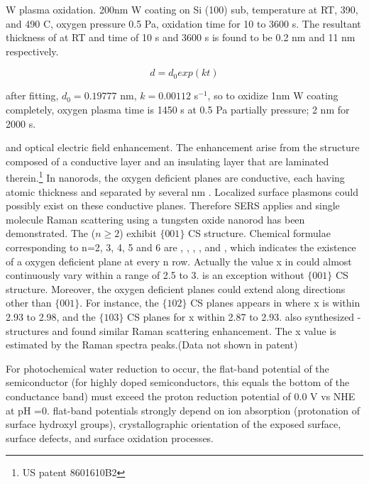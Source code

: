 W plasma oxidation.\cite{Romanyuk2005} 200nm W coating on Si (100) sub, temperature at RT, 390, and 490 C, oxygen pressure 0.5 Pa, oxidation time for 10 to 3600 s. The resultant thickness of  at RT  and time of 10 s and 3600 s is found to be 0.2 nm and 11 nm respectively.

\[
 d = d_0 exp(kt)
\]

after fitting, $d_0 = 0.19777$ nm, $k = 0.00112 $ s$^{-1}$, so to oxidize 1nm W coating completely, oxygen plasma time is 1450 s at 0.5 Pa partially pressure; 2 nm for 2000 s.



 and optical electric field enhancement. The enhancement arise from the structure composed of a conductive layer and an insulating layer that are laminated therein.\footnote{US patent 8601610B2} In  nanorods, the oxygen deficient planes are conductive, each having atomic thickness and separated by several nm . Localized surface plasmons could possibly exist on these conductive planes. Therefore SERS applies and single molecule Raman scattering using a tungsten oxide nanorod has been demonstrated. The  ($n \geq 2$) exhibit $\{ 001 \}$ CS structure. Chemical formulae corresponding to n=2, 3, 4, 5 and 6 are , , , , and , which indicates the existence of a oxygen deficient plane at every n row. Actually the value x in  could almost continuously vary within a range of 2.5 to 3.  is an exception without $\{ 001 \}$ CS structure. Moreover, the oxygen deficient planes could extend along directions other than $\{ 001 \}$. For instance, the $\{ 102 \}$ CS planes appears in  where x is within 2.93 to 2.98, and  the $\{ 103 \}$ CS planes for x within 2.87 to 2.93.\cite{Sloan1999}  \citeauthor{Shingaya2013} also synthesized - structures and found similar Raman scattering enhancement. The x value is estimated by the Raman spectra peaks.\cite{Shingaya2013}(Data not shown in patent)

For photochemical water reduction to occur, the flat-band potential of the semiconductor (for highly doped semiconductors, this equals the bottom of the conductance band) must exceed the proton reduction potential of 0.0 V vs NHE at pH =0. \cite{Osterloh2008} flat-band potentials strongly depend on ion absorption (protonation of surface hydroxyl groups), crystallographic orientation of the exposed surface, surface defects, and surface oxidation processes.


